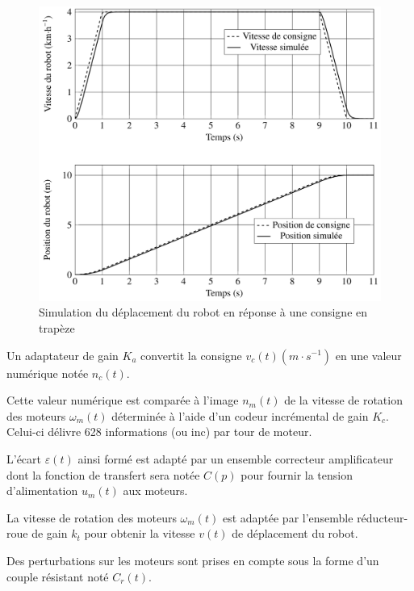 \begin{figure}[ht!]
\begin{center}
 \includegraphics[width=0.7\linewidth]{img/fig05}
\end{center}
\caption{Simulation du déplacement du robot en réponse à une consigne en trapèze}
\label{fig05}
\end{figure}

Un adaptateur de gain $K_a$ convertit la consigne $v_c(t)(m\cdot s^{-1})$ en une valeur numérique notée $n_c(t)$.

Cette valeur numérique est comparée à l'image $n_m(t)$ de la vitesse de rotation des moteurs $\omega_m(t)$ déterminée à l'aide d'un codeur incrémental de gain $K_c$. Celui-ci délivre 628 informations (ou inc) par tour de moteur.

L'écart $\varepsilon(t)$ ainsi formé est adapté par un ensemble correcteur amplificateur dont la fonction de transfert sera notée $C(p)$ pour fournir la tension d'alimentation $u_m(t)$ aux moteurs.

La vitesse de rotation des moteurs $\omega_m(t)$ est adaptée par l'ensemble réducteur-roue de gain $k_t$ pour obtenir la vitesse $v(t)$ de déplacement du robot.

Des perturbations sur les moteurs sont prises en compte sous la forme d'un couple résistant noté $C_r(t)$.




